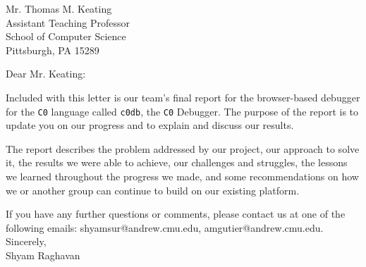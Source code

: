 \documentclass[11pt,stdletter,sigleft]{letter}
\begin{document}
\begin{letter}{Mr. Thomas M. Keating \\
    Assistant Teaching Professor \\
    School of Computer Science \\
    Pittsburgh, PA 15289}

\opening{Dear Mr. Keating:}
\vspace{5mm}

Included with this letter is our team's final report for the browser-based
debugger for the {\tt C0} language called {\tt c0db}, the {\tt C0} Debugger.
The purpose of the report is to update you on our progress and to explain and
discuss our results.

The report describes the problem addressed by our project, our approach to
solve it, the results we were able to achieve, our challenges and struggles,
the lessons we learned throughout the progress we made, and some
recommendations on how we or another group can continue to build on our
existing platform.

If you have any further questions or comments, please contact us at one of the
following emails: shyamsur@andrew.cmu.edu, amgutier@andrew.cmu.edu.\\

Sincerely,\\[4em]
Shyam Raghavan


\end{letter}
\end{document}
